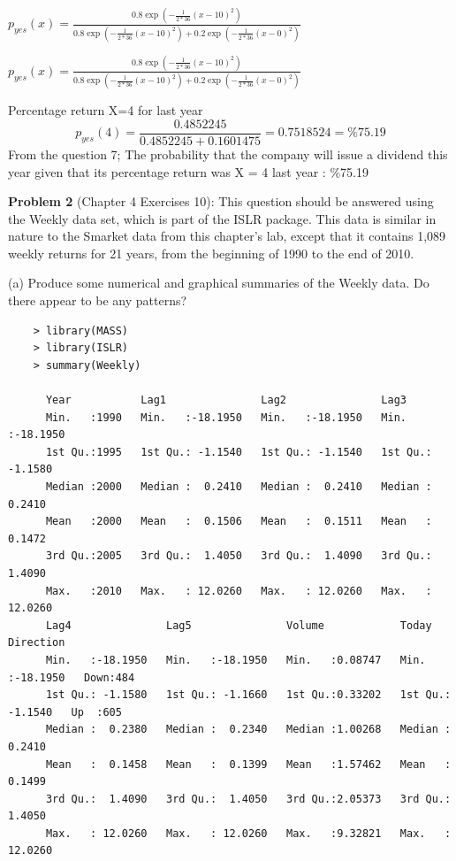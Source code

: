\documentclass{article}
\begin{document}
\begin{center}
$p_{yes}(x) = \frac{  0.8  \exp(- \frac{1}{2*36 } (x - 10)^2 ) } 
                             { 0.8   \exp(- \frac{1}{2*36} (x -10 )^2)  +  
	                           0.2   \exp(- \frac{1}{2*36} (x - 0 )^2) }  $      
\end{center}

\begin{center}
	$p_{yes}(x) = \frac{  0.8  \exp(- \frac{1}{2*36 } (x - 10)^2 ) } 
	{ 0.8   \exp(- \frac{1}{2*36} (x -10 )^2)  +  
		0.2   \exp(- \frac{1}{2*36} (x - 0 )^2) }  $      
\end{center}
Percentage return X=4 for last year
\begin{equation}
	p_{yes}(4) = \frac{   0.4852245 } 
	{  0.4852245 +  0.1601475}  = 0.7518524  = \% 75.19      
\end{equation}
From the question 7; The probability that the company will issue a dividend this year given that its percentage return was X = 4 last year : \%75.19


\newpage

{\bf Problem 2} (Chapter 4 Exercises 10):
This question should be answered using the Weekly data set, which is part of the ISLR package. This data is similar in nature to the Smarket data from this chapter’s lab, except that it contains 1,089 weekly returns for 21 years, from the beginning of 1990 to the end of 2010.

(a) Produce some numerical and graphical summaries of the Weekly data. Do there appear to be any patterns?

\begin{program}
	\begin{verbatim}
	> library(MASS)
	> library(ISLR)
	> summary(Weekly)
	
      Year           Lag1               Lag2               Lag3         
      Min.   :1990   Min.   :-18.1950   Min.   :-18.1950   Min.   :-18.1950  
      1st Qu.:1995   1st Qu.: -1.1540   1st Qu.: -1.1540   1st Qu.: -1.1580  
      Median :2000   Median :  0.2410   Median :  0.2410   Median :  0.2410  
      Mean   :2000   Mean   :  0.1506   Mean   :  0.1511   Mean   :  0.1472  
      3rd Qu.:2005   3rd Qu.:  1.4050   3rd Qu.:  1.4090   3rd Qu.:  1.4090  
      Max.   :2010   Max.   : 12.0260   Max.   : 12.0260   Max.   : 12.0260  
      Lag4               Lag5               Volume            Today             Direction 
      Min.   :-18.1950   Min.   :-18.1950   Min.   :0.08747   Min.   :-18.1950   Down:484  
      1st Qu.: -1.1580   1st Qu.: -1.1660   1st Qu.:0.33202   1st Qu.: -1.1540   Up  :605  
      Median :  0.2380   Median :  0.2340   Median :1.00268   Median :  0.2410             
      Mean   :  0.1458   Mean   :  0.1399   Mean   :1.57462   Mean   :  0.1499             
      3rd Qu.:  1.4090   3rd Qu.:  1.4050   3rd Qu.:2.05373   3rd Qu.:  1.4050             
      Max.   : 12.0260   Max.   : 12.0260   Max.   :9.32821   Max.   : 12.0260             
   	\end{verbatim}
\end{program}
\end{document}
